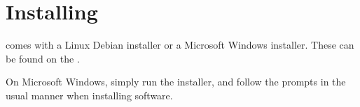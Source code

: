 \section{Installing \CNAME}\label{sec:installing}

\CNAME comes with a Linux Debian installer or a Microsoft Windows installer. These can be found on the \github. 

On Microsoft Windows, simply run the installer, and follow the prompts in the usual manner when installing software. 



